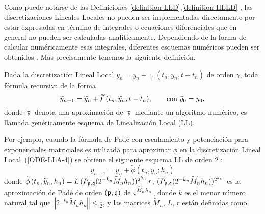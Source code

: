 Como puede notarse de las Definiciones \ref{definition LLD},\ref{definition HLLD} , las
discretizaciones Lineales Locales no pueden ser implementadas directamente por
estar expresadas en término de integrales o ecuaciones diferenciales que en general no pueden ser
calculadas analíticamente. Dependiendo de la forma de calcular  numéricamente esas integrales,
 diferentes esquemas numéricos pueden ser obtenidos \cite{Jimenez05AMC,Jimenez13}.
 Más precisamente tenemos la siguiente definición.
\begin{definition}
	\label{definition LLS} Dada la discretización Lineal Local 
	  $y_n=y_{n}+\digamma(t_{n},y_{n},t-t_{n})$
	 de orden $\gamma $, toda fórmula recursiva de la forma 
	\begin{equation*}
	 \widetilde{y}_{n+1}=\widetilde{y}_{n}+\widetilde{\digamma}(t_{n},\widetilde{y}_{n},t-t_{n})
	 , \text{ \ \ \ \
		\ con }\widetilde{y}_{0}=y_{0},
	\end{equation*}%
	donde $\widetilde{\digamma}$ denota una aproximación
	de $\digamma$ mediante un algoritmo numérico, es
	llamada genéricamente esquema de Linealización Local (LL).
\end{definition}

Por ejemplo, cuando la fórmula de Padé con escalamiento y potenciación para exponenciales matriciales \cite{moler2003nineteen} es utilizada para
aproximar $\phi$ en la discretización Lineal Local~(\ref{ODE-LLA-4}) se obtiene el siguiente esquema LL de orden $2$ \cite{Jimenez02AMC}:
\begin{equation} 
\widetilde{y}_{n+1}=\widetilde{y}_{n}+\widetilde{\phi}\left( t_{n},\widetilde{y}_{n};h_{n}\right) \label{LL-scheme}
\end{equation} 
donde $\widetilde{\phi }\left( t_{n},\widetilde{y}
_{n},h_{n}\right) =L\,(P_{\mathfrak{p},\mathfrak{q}}(2^{-k_{n}}\widetilde{M}_{n}h_{n}))^{2^{k_{n}}}\,r$, 
$(P_{\mathfrak{p},\mathfrak{q}}(2^{-k_{n}}\widetilde{M}_{n}h_{n}))^{2^{k_{n}}}$ es la aproximación
de Padé de orden $(\mathfrak{p},\mathfrak{q})$ de  $\mathrm{e}^{\widetilde{M}_{n}h_{n}}$, donde
$k$ es el menor número natural tal que $\left\Vert 2^{-k_{n}}\widetilde{M}_{n}h_{n}\right\Vert \leq \frac{1}{2}$, 
y las matrices $\widetilde{M}_{n}$, $L$, $r$ están definidas como

